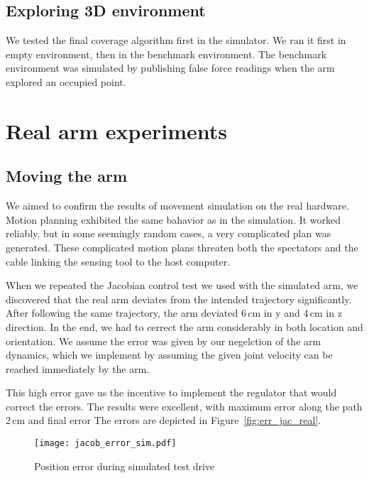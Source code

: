 \documentclass[buriama8_dp.tex]{subfiles}
\begin{document}
\subsection{Exploring 3D environment}
\label{subsec:sim_arm_cover}

We tested the final coverage algorithm first in the simulator. We ran it first in empty environment, then in the benchmark environment. The benchmark environment was simulated by publishing false force readings when the arm explored an occupied point.




\section{Real arm experiments}
\label{sec:exp_real_arm}

\subsection{Moving the arm}
\label{subsec:label}

We aimed to confirm the results of movement simulation on the real hardware. Motion planning exhibited the same bahavior as in the simulation. It worked reliably, but in some seemingly random cases, a very complicated plan was generated. These complicated motion plans threaten both the spectators and the cable linking the sensing tool to the host computer.

When we repeated the Jacobian control test we used with the simulated arm, we discovered that the real arm deviates from the intended trajectory significantly. After following the same trajectory, the arm deviated 6\,cm in \m y and 4\,cm in \m z direction. In the end, we had to cerrect the arm considerably in both location and orientation. We assume the error was given by our negelction of the arm dynamics, which we implement by assuming the given joint velocity can be reached immediately by the arm.

This high error gave us the incentive to implement the regulator that would correct the errors. The results were excellent, with maximum error along the path 2\,cm and final error  The errors are depicted in Figure~\ref{fig:err_jac_real}. 

\begin{figure}[ht]
  \centering
  \texttt{[image: jacob\_error\_sim.pdf]}
  \caption{Position error during simulated test drive}
  \label{fig:err_jac_sim}
\end{figure}
\end{document}
